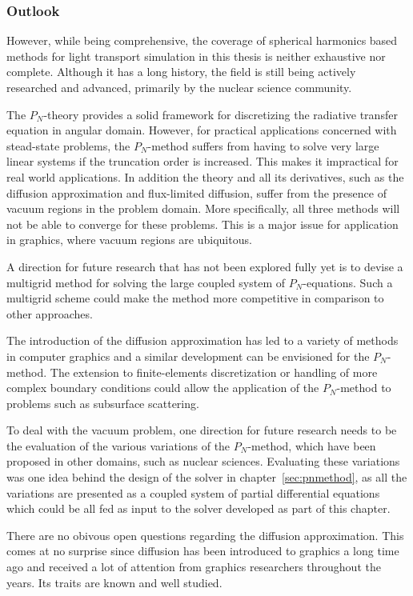 \subsubsection*{Outlook}

However, while being comprehensive, the coverage of spherical harmonics based methods for light transport simulation in this thesis is neither exhaustive nor complete. Although it has a long history, the field is still being actively researched and advanced, primarily by the nuclear science community.

The $P_N$-theory provides a solid framework for discretizing the radiative transfer equation in angular domain. However, for practical applications concerned with stead-state problems, the $P_N$-method suffers from having to solve very large linear systems if the truncation order is increased. This makes it impractical for real world applications. In addition the theory and all its derivatives, such as the diffusion approximation and flux-limited diffusion, suffer from the presence of vacuum regions in the problem domain. More specifically, all three methods will not be able to converge for these problems. This is a major issue for application in graphics, where vacuum regions are ubiquitous.

A direction for future research that has not been explored fully yet is to devise a multigrid method for solving the large coupled system of $P_N$-equations. Such a multigrid scheme could make the method more competitive in comparison to other approaches.

The introduction of the diffusion approximation has led to a variety of methods in computer graphics and a similar development can be envisioned for the $P_N$-method. The extension to finite-elements discretization or handling of more complex boundary conditions could allow the application of the $P_N$-method to problems such as subsurface scattering.

To deal with the vacuum problem, one direction for future research needs to be the evaluation of the various variations of the $P_N$-method, which have been proposed in other domains, such as nuclear sciences. Evaluating these variations was one idea behind the design of the solver in chapter~\ref{sec:pnmethod}, as all the variations are presented as a coupled system of partial differential equations which could be all fed as input to the solver developed as part of this chapter.

There are no obivous open questions regarding the diffusion approximation. This comes at no surprise since diffusion has been introduced to graphics a long time ago and received a lot of attention from graphics researchers throughout the years. Its traits are known and well studied.

